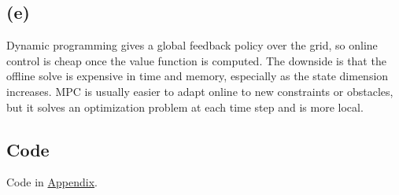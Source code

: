 \subsection*{(e)}
Dynamic programming gives a global feedback policy over the grid, so online
control is cheap once the value function is computed. The downside is that the
offline solve is expensive in time and memory, especially as the state dimension
increases. MPC is usually easier to adapt online to new constraints or obstacles,
but it solves an optimization problem at each time step and is more local.

\subsection*{Code}
Code in \hyperref[hj_reachability]{Appendix}.
